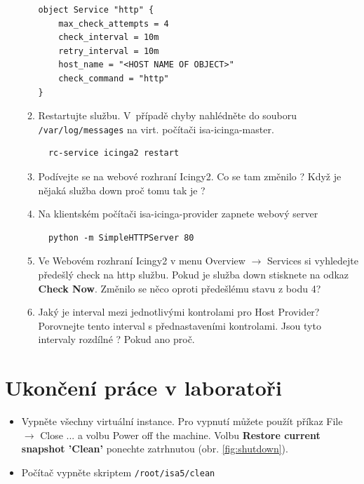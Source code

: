 \begin{itemize}
\begin{enumerate}
\begin{verbatim}
object Service "http" {
    max_check_attempts = 4
    check_interval = 10m
    retry_interval = 10m
    host_name = "<HOST NAME OF OBJECT>"
    check_command = "http"
}

\end{verbatim} 
            \item Restartujte službu. V~případě chyby nahlédněte do souboru {\tt /var/log/messages} na virt. počítači isa-icinga-master.
\begin{verbatim}
  rc-service icinga2 restart
\end{verbatim} 
          \item Podívejte se na webové rozhraní Icingy2. Co se tam změnilo ? 
          Když je nějaká služba down proč tomu tak je ?

          \item Na klientském počítači isa-icinga-provider zapnete webový server
\begin{verbatim}
  python -m SimpleHTTPServer 80
\end{verbatim}
          \item Ve Webovém rozhraní Icingy2 v menu Overview $\rightarrow$ Services si vyhledejte předešlý check na http službu. Pokud je služba down stisknete na odkaz {\bf Check Now}. Změnilo se něco oproti předešlému stavu z bodu 4?

          \item Jaký je interval mezi jednotlivými kontrolami pro Host Provider? Porovnejte tento interval s přednastaveními kontrolami. Jsou tyto intervaly rozdílné ? Pokud ano proč.

\end{enumerate}
\end{itemize}

\section*{Ukončení práce v laboratoři}
\begin{itemize}
  \item Vypněte všechny virtuální instance. Pro vypnutí můžete použít příkaz File $\rightarrow$ Close ... a volbu Power off the machine. Volbu {\bf Restore current snapshot 'Clean'} ponechte zatrhnutou (obr. \ref{fig:shutdown}).
  \item Počítač vypněte skriptem {\tt /root/isa5/clean}
\end{itemize}

